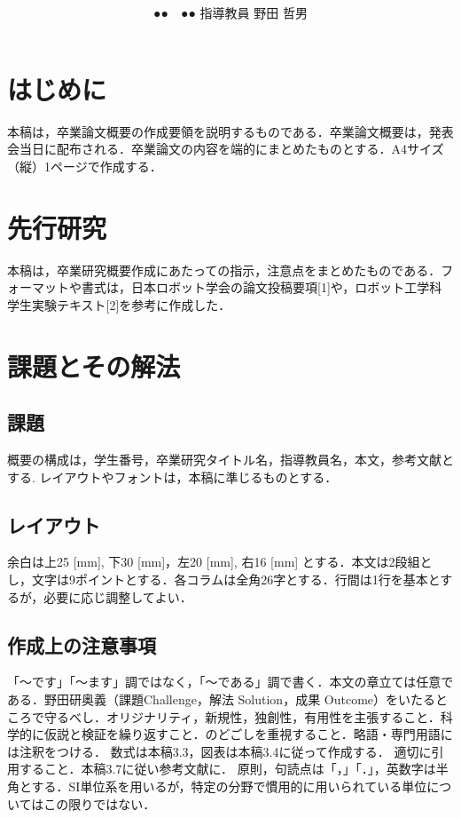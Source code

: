 \documentclass[10pt,twocolumn]{jsarticle}
\title{
\flushleft{\large \textsf{X20-222}\\}
\centering{製造業向けロボットを知能化するアルゴリズムの研究}}
\author{●●　●● \hspace{10mm} 指導教員 野田 哲男}
\date{}
\begin{document}
%
%
\pagestyle{empty}
\maketitle
\small

\section{はじめに}
本稿は，卒業論文概要の作成要領を説明するものである．卒業論文概要は，発表会当日に配布される．卒業論文の内容を端的にまとめたものとする．A4サイズ（縦）1ページで作成する． 

\section{先行研究}
本稿は，卒業研究概要作成にあたっての指示，注意点をまとめたものである．フォーマットや書式は，日本ロボット学会の論文投稿要項[1]や，ロボット工学科学生実験テキスト[2]を参考に作成した．

\section{課題とその解法}
\subsection{課題} 
概要の構成は，学生番号，卒業研究タイトル名，指導教員名，本文，参考文献とする. レイアウトやフォントは，本稿に準じるものとする．
\subsection{レイアウト}
余白は上25 [mm], 下30 [mm]，左20 [mm], 右16 [mm] とする．本文は2段組とし，文字は9ポイントとする．各コラムは全角26字とする．行間は1行を基本とするが，必要に応じ調整してよい． 
\subsection{作成上の注意事項}
「〜です」「〜ます」調ではなく，「〜である」調で書く．本文の章立ては任意である．野田研奥義（課題Challenge，解法 Solution，成果 Outcome）をいたるところで守るべし．オリジナリティ，新規性，独創性，有用性を主張すること．科学的に仮説と検証を繰り返すこと．のどごしを重視すること．略語・専門用語には注釈をつける．
数式は本稿3.3，図表は本稿3.4に従って作成する． 
適切に引用すること．本稿3.7に従い参考文献に． 
原則，句読点は「，」「．」，英数字は半角とする．SI単位系を用いるが，特定の分野で慣用的に用いられている単位についてはこの限りではない． 
\end{document}
